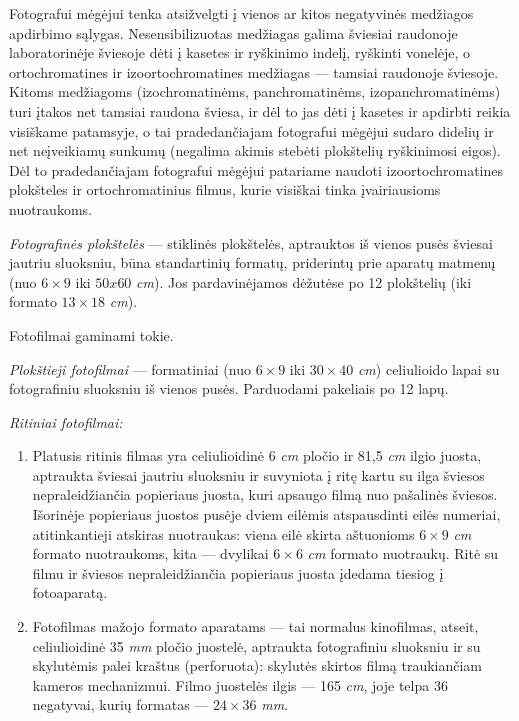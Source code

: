 \documentclass{book}
\begin{document}
					Fotografui mėgėjui tenka atsižvelgti į vienos ar kitos negatyvinės medžiagos apdirbimo sąlygas. Nesensibilizuotas medžiagas galima šviesiai raudonoje laboratorinėje šviesoje dėti į kasetes ir ryškinimo indelį, ryškinti vonelėje, o ortochromatines ir izoortochromatines medžiagas --- tamsiai raudonoje šviesoje. Kitoms medžiagoms (izochromatinėms, panchromatinėms, izopanchromatinėms) turi įtakos net tamsiai raudona šviesa, ir dėl to jas dėti į kasetes ir apdirbti reikia visiškame patamsyje, o tai pradedančiajam fotografui mėgėjui sudaro didelių ir net neįveikiamų sunkumų (negalima akimis stebėti plokštelių ryškinimosi eigos). Dėl to pradedančiajam fotografui mėgėjui patariame naudoti izoortochromatines plokšteles ir ortochromatinius filmus, kurie visiškai tinka įvairiausioms nuotraukoms.

					\textit{Fotografinės plokštelės} --- stiklinės plokštelės, aptrauktos iš vienos pusės šviesai jautriu sluoksniu, būna standartinių formatų, priderintų prie aparatų matmenų (nuo $6 \times 9$ iki $50 x 60$ \textit{cm}). Jos pardavinėjamos dėžutėse po 12 plokštelių (iki formato $13 \times 18$ \textit{cm}).

					Fotofilmai gaminami tokie.

					\textit{Plokštieji fotofilmai} --- formatiniai (nuo $6 \times 9$ iki $30 \times 40$ \textit{cm}) celiulioido lapai su fotografiniu sluoksniu iš vienos pusės. Parduodami pakeliais po 12 lapų.

					\textit{Ritiniai fotofilmai:}
					\begin{enumerate}
						\item Platusis ritinis filmas yra celiulioidinė 6 \textit{cm} pločio ir 81,5 \textit{cm} ilgio juosta, aptraukta šviesai jautriu sluoksniu ir suvyniota į ritę kartu su ilga šviesos nepraleidžiančia popieriaus juosta, kuri apsaugo filmą nuo pašalinės šviesos. Išorinėje popieriaus juostos pusėje dviem eilėmis atspausdinti eilės numeriai, atitinkantieji atskiras nuotraukas: viena eilė skirta aštuonioms $6 \times 9$ \textit{cm} formato nuotraukoms, kita --- dvylikai $6 \times 6$ \textit{cm} formato nuotraukų. Ritė su filmu ir šviesos nepraleidžiančia popieriaus juosta įdedama tiesiog į fotoaparatą.
						\item Fotofilmas mažojo formato aparatams --- tai normalus kinofilmas, atseit, celiulioidinė 35 \textit{mm} pločio juostelė, aptraukta fotografiniu sluoksniu ir su skylutėmis palei kraštus (perforuota): skylutės skirtos filmą traukiančiam kameros mechanizmui. Filmo juostelės ilgis --- 165 \textit{cm}, joje telpa 36 negatyvai, kurių formatas --- $24 \times 36$ \textit{mm}.
					\end{enumerate}
\end{document}
